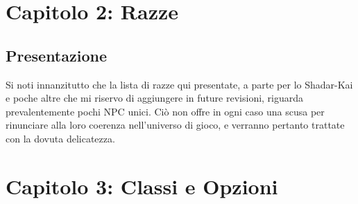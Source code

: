 \documentclass[10pt,twoside, twocolumn, openany,nodeprecatedcode]{dndbook}
\begin{document}
\raggedend




\chapter{Capitolo 2: Razze} %

\section*{Presentazione}
Si noti innanzitutto che la lista di razze qui presentate, a parte per lo Shadar-Kai e poche altre che mi riservo di aggiungere in future revisioni, riguarda prevalentemente pochi NPC unici. Ciò non offre in ogni caso una scusa per rinunciare alla loro coerenza nell'universo di gioco, e verranno pertanto trattate con la dovuta delicatezza.
 

\clearpage







\chapter{Capitolo 3: Classi e Opzioni} %



\end{document}
